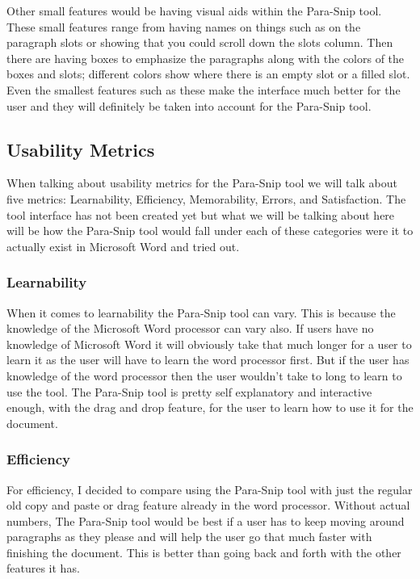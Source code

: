 \documentclass{article}
\begin{document}
{	Other small features would be having visual aids within the Para-Snip tool. These small features range from having names on things such as on the paragraph slots or showing that you could scroll down the slots column. Then there are having boxes to emphasize the paragraphs along with the colors of the boxes and slots; different colors show where there is an empty slot or a filled slot. Even the smallest features such as these make the interface much better for the user and they will definitely be taken into account for the Para-Snip tool.	

\subsection{Usability Metrics}
	When talking about usability metrics for the Para-Snip tool we will talk about five metrics: Learnability, Efficiency, Memorability, Errors, and Satisfaction. The tool interface has not been created yet but what we will be talking about here will be how the Para-Snip tool would fall under each of these categories were it to actually exist in Microsoft Word and tried out.

\subsubsection{Learnability}
	When it comes to learnability the Para-Snip tool can vary. This is because the knowledge of the Microsoft Word processor can vary also. If users have no knowledge of Microsoft Word it will obviously take that much longer for a user to learn it as the user will have to learn the word processor first. But if the user has knowledge of the word processor then the user wouldn't take to long to learn to use the tool. The Para-Snip tool is pretty self explanatory and interactive enough, with the drag and drop feature, for the user to learn how to use it for the document.
	
\subsubsection{Efficiency} 
	For efficiency, I decided to compare using the Para-Snip tool with just the regular old copy and paste or drag feature already in the word processor. Without actual numbers, The Para-Snip tool would be best if a user has to keep moving around paragraphs as they please and will help the user go that much faster with finishing the document. This is better than going back and forth with the other features it has.

}
\end{document}
